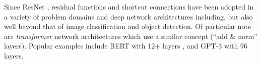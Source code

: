 \documentclass[10pt]{article}
\begin{document}

Since ResNet \cite{7780459}, residual functions and shortcut connections have been adopted in a variety of problem domains and deep network architectures including, but also well beyond that of image classification and object detection. Of particular note are \textit{transformer} network architectures which use a similar concept (``add \& norm'' layers). Popular examples include BERT with 12+ layers \cite{DBLP:journals/corr/abs-1810-04805}, and GPT-3 with 96 layers\cite{DBLP:journals/corr/abs-2005-14165}.



\end{document}
